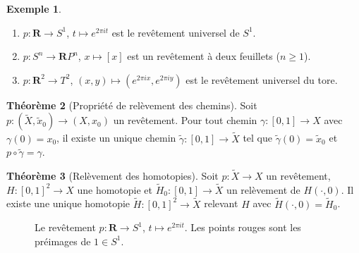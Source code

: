 \documentclass[12pt,a4paper,openany]{book}
\theoremstyle{definition}
\theoremstyle{cours}
\newtheorem{theoreme}{Théorème}[chapter]
\theoremstyle{coursnormal}
\newtheorem{exemple}[theoreme]{Exemple}
\begin{document}
\begin{exemple}
\label{ex:revetements-classiques}
\begin{enumerate}[label=(\alph*)]
  \item $p\colon\mathbf{R}\to S^1$, $t\mapsto e^{2\pi it}$ est le
    revêtement universel de $S^1$.
  \item $p\colon S^n\to\mathbf{R}P^n$, $x\mapsto[x]$ est un
    revêtement à deux feuillets ($n\ge 1$).
  \item $p\colon\mathbf{R}^2\to T^2$, $(x,y)\mapsto(e^{2\pi ix},
    e^{2\pi iy})$ est le revêtement universel du tore.
\end{enumerate}
\end{exemple}

\begin{theoreme}[Propriété de relèvement des chemins]
\label{thm:relevement-chemins}
Soit $p\colon(\tilde{X},\tilde{x}_0)\to(X,x_0)$ un revêtement.
Pour tout chemin $\gamma\colon[0,1]\to X$ avec $\gamma(0)=x_0$,
il existe un unique chemin $\tilde{\gamma}\colon[0,1]\to\tilde{X}$
tel que $\tilde{\gamma}(0)=\tilde{x}_0$ et
$p\circ\tilde{\gamma}=\gamma$.
\end{theoreme}

\begin{theoreme}[Relèvement des homotopies]
\label{thm:relevement-homotopies}
Soit $p\colon\tilde{X}\to X$ un revêtement, $H\colon[0,1]^2\to X$
une homotopie et $\tilde{H}_0\colon[0,1]\to\tilde{X}$ un relèvement
de $H(\cdot,0)$. Il existe une unique homotopie
$\tilde{H}\colon[0,1]^2\to\tilde{X}$ relevant $H$ avec
$\tilde{H}(\cdot,0)=\tilde{H}_0$.
\end{theoreme}

\begin{figure}[ht]
\centering
{}
\caption{Le revêtement $p\colon\mathbf{R}\to S^1$, $t\mapsto e^{2\pi it}$.
Les points rouges sont les préimages de $1\in S^1$.}
\label{fig:revetement-S1}
\end{figure}
\end{document}
